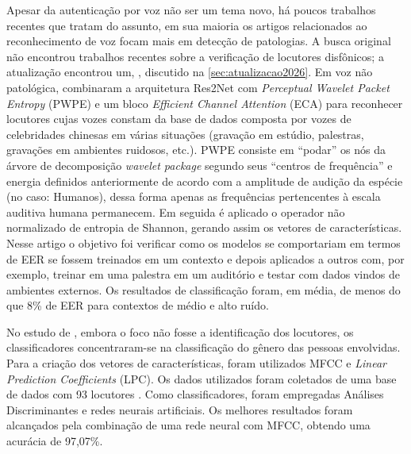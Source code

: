 			\par Apesar da autenticação por voz não ser um tema novo, há poucos trabalhos recentes que tratam do assunto, em sua maioria os artigos relacionados ao reconhecimento de voz focam mais em detecção de patologias. A busca original não encontrou trabalhos recentes sobre a verificação de locutores disfônicos; a atualização encontrou um, , discutido na \autoref{sec:atualizacao2026}. Em voz não patológica,  combinaram a arquitetura Res2Net \cite{gao2019res2net} com \textit{Perceptual Wavelet Packet Entropy} (PWPE) e um bloco \textit{Efficient Channel Attention} (ECA) \cite{DBLP:journals/corr/abs-1910-03151} para reconhecer locutores cujas vozes constam da base de dados \cite{fan2020cn} composta por vozes de celebridades chinesas em várias situações (gravação em estúdio, palestras, gravações em ambientes ruidosos, etc.). PWPE consiste em ``podar'' os nós da árvore de decomposição \textit{wavelet package} segundo seus ``centros de frequência'' e energia definidos anteriormente de acordo com a amplitude de audição da espécie (no caso: Humanos), dessa forma apenas as frequências pertencentes à escala auditiva humana permanecem. Em seguida é aplicado o operador não normalizado de entropia de Shannon, gerando assim os vetores de características. Nesse artigo o objetivo foi verificar como os modelos se comportariam em termos de EER se fossem treinados em um contexto e depois aplicados a outros com, por exemplo, treinar em uma palestra em um auditório e testar com dados vindos de ambientes externos. Os resultados de classificação foram, em média, de menos do que 8\% de EER para contextos de médio e alto ruído.
			
			\par No estudo de , embora o foco não fosse a identificação dos locutores, os classificadores concentraram-se na classificação do gênero das pessoas envolvidas. Para a criação dos vetores de características, foram utilizados MFCC e \textit{Linear Prediction Coefficients} (LPC). Os dados utilizados foram coletados de uma base de dados com 93 locutores \cite{10.1121/1.411872}. Como classificadores, foram empregadas Análises Discriminantes e redes neurais artificiais. Os melhores resultados foram alcançados pela combinação de uma rede neural com MFCC, obtendo uma acurácia de 97,07\%.
			

